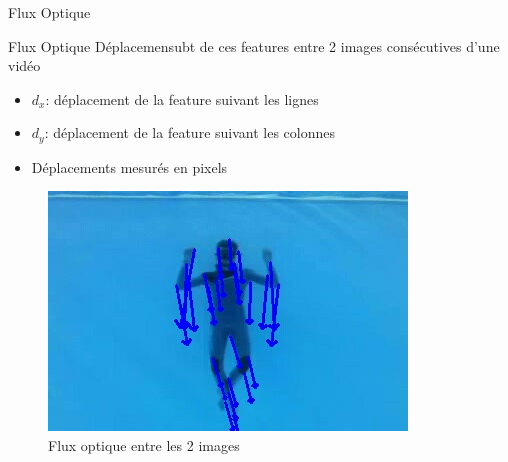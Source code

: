 \documentclass{bredelebeamer}
\begin{document}
\begin{frame}{Flux Optique}

\begin{alertblock}{Flux Optique}
Déplacemensubt de ces features entre 2 images consécutives d'une vidéo
\begin{itemize}
	\item $d_{x}$: déplacement de la feature suivant les lignes
	\item $d_{y}$: déplacement de la feature suivant les colonnes
	\item Déplacements mesurés en pixels
\end{itemize}
\end{alertblock}

\begin{figure}
\centering
\includegraphics[scale=0.4]{images/plongeurOpticalFlow.jpeg}
\caption{Flux optique entre les 2 images}
\end{figure}

\end{frame}

\end{document}
